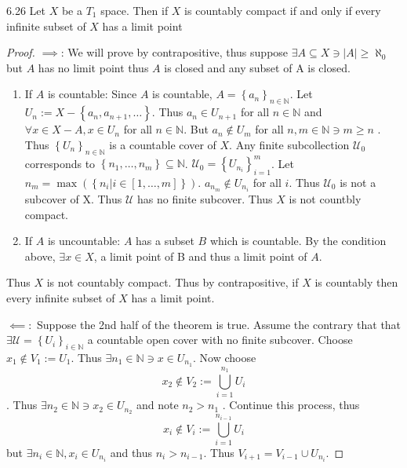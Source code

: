 \documentclass{article}
\newcommand{\N}{\mathbb{N}}
\newcommand{\abs}[1]{\left\lvert #1\right\rvert}
\begin{document}
\bigskip

\begin{claim}{6.26}\label{Claim 6.26.}
    Let $X$ be a $T_1$ space. Then if $X$ is countably compact if and only if every infinite subset of $X$ has a limit point     
\end{claim}
\begin{proof}
    $\implies$: We will prove by contrapositive, thus suppose $\exists A \subseteq X \ni \abs{A} \geq \aleph_0$ but $A$ has no limit point thus $A$ is closed and any subset of A is closed. 
    
    \begin{enumerate}
        \item If $A$ is countable: Since $A$ is countable, $A = \left\{ a_n \right\}_{n \in \N}$. Let $U_n := X - \left\{ a_n, a_{n + 1}, \dots \right\}$. Thus $a_n \in U_{n + 1}$ for all $n \in \N$ and $\forall x \in X - A, x \in U_{n}$ for all $n \in \N$. But $a_n \not \in U_m$ for all $n, m \in \N \ni m \geq n$ . Thus $\left\{ U_n \right\}_{n \in \N}$ is a countable cover of $X$. Any finite subcollection $\mathcal{U}_0$ corresponds to $\left\{ n_1, \dots, n_m \right\} \subseteq \N$. $\mathcal{U}_0 = \left\{ U_{n_i} \right\}_{i = 1}^m$. Let $n_m = \max\left(\left\{ n_i | i \in [1, \dots, m] \right\}\right)$. $a_{n_m} \not \in U_{n_i}$ for all $i$. Thus $\mathcal{U_0}$ is not a subcover of X. Thus $\mathcal{U}$ has no finite subcover. Thus $X$ is not countbly compact.        
        \item If $A$ is uncountable: $A$ has a subset $B$ which is countable. By the condition above, $\exists x \in X$, a limit point of B and thus a limit point of $A$.       
    \end{enumerate}
    
    Thus $X$ is not countably compact. Thus by contrapositive, if $X$ is countably then every infinite subset of $X$ has a limit point. 
    
    
    $\impliedby:$ Suppose the 2nd half of the theorem is true. Assume the contrary that that $\exists \mathcal{U} = \left\{ U_i \right\}_{i \in \N}$ a countable open cover with no finite subcover. Choose $x_1 \not \in V_1 := U_{1}$. Thus $\exists n_1 \in \N \ni x \in U_{n_1}$. Now choose \[x_2 \not \in V_2 := \bigcup_{i = 1}^{n_1}U_i\]. Thus $\exists n_2 \in \N \ni x_2 \in U_{n_2}$ and note $n_2 > n_1$ . Continue this process, thus \[x_i \not \in V_{i} := \bigcup_{i = 1}^{n_{i - 1}}U_{i}\] but $\exists n_{i} \in \N, x_i \in U_{n_i}$ and thus $n_i > n_{i - 1}$. Thus $V_{i + 1} = V_{i - 1} \cup U_{n_i}$.   



\end{proof}
\end{document}
